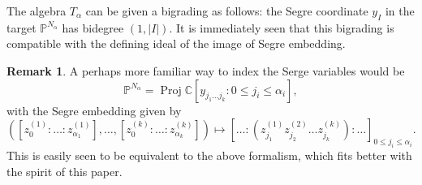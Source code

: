 \documentclass[a4paper,11pt]{amsart}
\theoremstyle{plain}
\theoremstyle{definition}
\newtheorem{remark}[theorem]{Remark}
\newcommand{\C}{\mathbb{C}}
\renewcommand{\P}{\mathbb{P}}
\DeclareMathOperator{\Proj}{Proj}
\begin{document}
The algebra $T_\alpha$ can be given a bigrading as follows: 
the Segre coordinate $y_{\scriptscriptstyle I}$ in the target $\P^{N_\alpha}$ has bidegree $(1,|I|)$. 
It is immediately seen that this bigrading is compatible with the defining ideal of the image of Segre embedding. 

\begin{remark} A perhaps more familiar way to index the Serge variables would be
\[\P^{N_\alpha} = \Proj \C\left[y_{j_1\ldots j_k} \colon {0\leq j_i\leq \alpha_i}\right], \]
with the Segre embedding given by 
\[ \left([z_0^{(1)}:\ldots : z_{\alpha_1}^{(1)}], \ldots,[z_0^{(k)}:\ldots : z_{\alpha_k}^{(k)}] \right)\mapsto \left[\ldots\colon \left(z_{j_1}^{(1)}z_{j_2}^{(2)}\ldots z_{j_k}^{(k)}\right) : \ldots\right]_{0\leq j_i\leq \alpha_i}.\]
This is easily seen to be equivalent to the above formalism, which fits better with the spirit of this paper. 
\end{remark}
\end{document}

